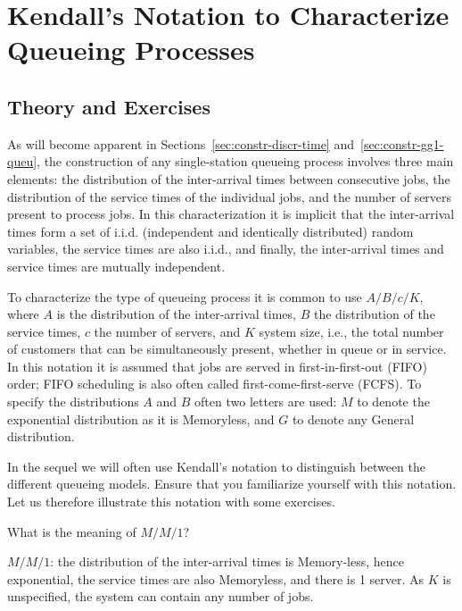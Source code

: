 
\section{Kendall's Notation to Characterize Queueing Processes}
\label{sec:kendalls-notation}




\subsection*{Theory and Exercises}

As will become apparent in Sections~\ref{sec:constr-discr-time}
and~\ref{sec:constr-gg1-queu}, the construction of any single-station queueing
process involves three main elements: 
the distribution of the
inter-arrival times between consecutive jobs, the distribution of the
service times of the individual jobs, and the number of servers
present to process jobs. In this characterization it is implicit that
the inter-arrival times form a set of i.i.d. (independent and
identically distributed) random variables, the service times are also
i.i.d., and finally, the inter-arrival times and service times are
mutually independent.

To characterize the type of queueing process it is common to use 
 $A/B/c/K$, where $A$ is the distribution of the
inter-arrival times, $B$ the distribution of the service times, $c$ the
number of servers, and $K$ system size, i.e., the total number of customers that can be simultaneously present, whether in queue or in service. In this notation it
is assumed that jobs are served in first-in-first-out (FIFO) order;
FIFO scheduling is also often called first-come-first-serve (FCFS). To specify the distributions $A$ and $B$ often two letters are used: $M$ to denote the exponential distribution as it is Memoryless, and $G$ to denote any General distribution. 

In the sequel we will often use Kendall's notation to distinguish between the different queueing models. Ensure that you familiarize yourself with this notation. Let us therefore illustrate this notation with some exercises. 

\begin{exercise}
  What is the meaning of $M/M/1$?
  \begin{solution}
$M/M/1$: the distribution of the inter-arrival times is
  Memory-less, hence exponential, the service times are also
  Memoryless, and there is 1 server. As $K$ is unspecified, the system can contain any number of jobs.
  \end{solution}
\end{exercise}

